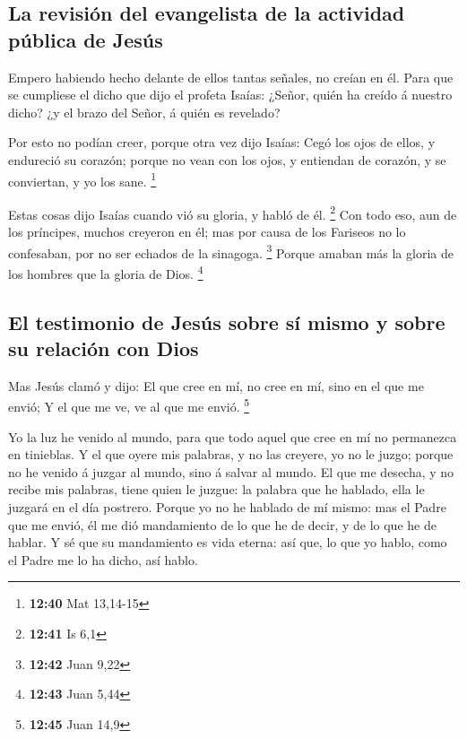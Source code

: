 \hypertarget{la-revisiuxf3n-del-evangelista-de-la-actividad-puxfablica-de-jesuxfas}{%
\subsection{La revisión del evangelista de la actividad pública de
Jesús}\label{la-revisiuxf3n-del-evangelista-de-la-actividad-puxfablica-de-jesuxfas}}

 Empero habiendo hecho delante de ellos tantas señales, no
creían en él.  Para que se cumpliese el dicho que dijo el
profeta Isaías: ¿Señor, quién ha creído á nuestro dicho? ¿y el brazo del
Señor, á quién es revelado?

 Por esto no podían creer, porque otra vez dijo Isaías:
 Cegó los ojos de ellos, y endureció su corazón; porque no
vean con los ojos, y entiendan de corazón, y se conviertan, y yo los
sane. \footnote{\textbf{12:40} Mat 13,14-15}

 Estas cosas dijo Isaías cuando vió su gloria, y habló de
él. \footnote{\textbf{12:41} Is 6,1}  Con todo eso, aun de
los príncipes, muchos creyeron en él; mas por causa de los Fariseos no
lo confesaban, por no ser echados de la sinagoga. \footnote{\textbf{12:42}
  Juan 9,22}  Porque amaban más la gloria de los hombres
que la gloria de Dios. \footnote{\textbf{12:43} Juan 5,44}

\hypertarget{el-testimonio-de-jesuxfas-sobre-suxed-mismo-y-sobre-su-relaciuxf3n-con-dios}{%
\subsection{El testimonio de Jesús sobre sí mismo y sobre su relación
con
Dios}\label{el-testimonio-de-jesuxfas-sobre-suxed-mismo-y-sobre-su-relaciuxf3n-con-dios}}

 Mas Jesús clamó y dijo: El que cree en mí, no cree en mí,
sino en el que me envió;  Y el que me ve, ve al que me
envió. \footnote{\textbf{12:45} Juan 14,9}

 Yo la luz he venido al mundo, para que todo aquel que cree
en mí no permanezca en tinieblas.  Y el que oyere mis
palabras, y no las creyere, yo no le juzgo; porque no he venido á juzgar
al mundo, sino á salvar al mundo.  El que me desecha, y no
recibe mis palabras, tiene quien le juzgue: la palabra que he hablado,
ella le juzgará en el día postrero.  Porque yo no he
hablado de mí mismo: mas el Padre que me envió, él me dió mandamiento de
lo que he de decir, y de lo que he de hablar.  Y sé que su
mandamiento es vida eterna: así que, lo que yo hablo, como el Padre me
lo ha dicho, así hablo.

